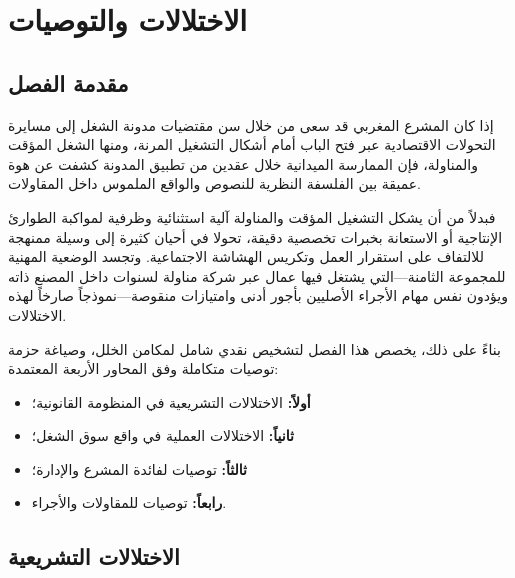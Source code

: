 
\chapter{الاختلالات والتوصيات}
\label{chap:chapitre10}

\section*{مقدمة الفصل}

إذا كان المشرع المغربي قد سعى من خلال سن مقتضيات مدونة الشغل إلى مسايرة التحولات الاقتصادية عبر فتح الباب أمام أشكال التشغيل المرنة، ومنها الشغل المؤقت والمناولة، فإن الممارسة الميدانية خلال عقدين من تطبيق المدونة كشفت عن هوة عميقة بين الفلسفة النظرية للنصوص والواقع الملموس داخل المقاولات.

فبدلاً من أن يشكل التشغيل المؤقت والمناولة آلية استثنائية وظرفية لمواكبة الطوارئ الإنتاجية أو الاستعانة بخبرات تخصصية دقيقة، تحولا في أحيان كثيرة إلى وسيلة ممنهجة للالتفاف على استقرار العمل وتكريس الهشاشة الاجتماعية. وتجسد الوضعية المهنية للمجموعة الثامنة—التي يشتغل فيها عمال عبر شركة مناولة لسنوات داخل المصنع ذاته ويؤدون نفس مهام الأجراء الأصليين بأجور أدنى وامتيازات منقوصة—نموذجاً صارخاً لهذه الاختلالات.

بناءً على ذلك، يخصص هذا الفصل لتشخيص نقدي شامل لمكامن الخلل، وصياغة حزمة توصيات متكاملة وفق المحاور الأربعة المعتمدة:
\begin{itemize}[leftmargin=*, itemsep=4pt]
    \item \textbf{أولاً:} الاختلالات التشريعية في المنظومة القانونية؛
    \item \textbf{ثانياً:} الاختلالات العملية في واقع سوق الشغل؛
    \item \textbf{ثالثاً:} توصيات لفائدة المشرع والإدارة؛
    \item \textbf{رابعاً:} توصيات للمقاولات والأجراء.
\end{itemize}

\section{الاختلالات التشريعية}

